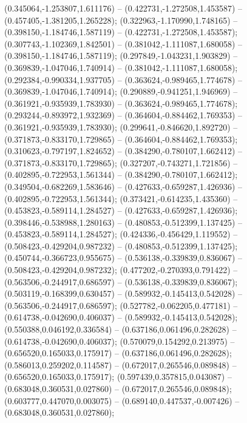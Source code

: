  (0.345064,-1.253807,1.611176) -- (0.422731,-1.272508,1.453587) -- (0.457405,-1.381205,1.265228);
 (0.322963,-1.170990,1.748165) -- (0.398150,-1.184746,1.587119) -- (0.422731,-1.272508,1.453587);
 (0.307743,-1.102369,1.842501) -- (0.381042,-1.111087,1.680058) -- (0.398150,-1.184746,1.587119);
 (0.297849,-1.043231,1.903829) -- (0.369839,-1.047046,1.740914) -- (0.381042,-1.111087,1.680058);
 (0.292384,-0.990334,1.937705) -- (0.363624,-0.989465,1.774678) -- (0.369839,-1.047046,1.740914);
 (0.290889,-0.941251,1.946969) -- (0.361921,-0.935939,1.783930) -- (0.363624,-0.989465,1.774678);
 (0.293244,-0.893972,1.932369) -- (0.364604,-0.884462,1.769353) -- (0.361921,-0.935939,1.783930);
 (0.299641,-0.846620,1.892720) -- (0.371873,-0.833170,1.729865) -- (0.364604,-0.884462,1.769353);
 (0.310623,-0.797197,1.824652) -- (0.384290,-0.780107,1.662412) -- (0.371873,-0.833170,1.729865);
 (0.327207,-0.743271,1.721856) -- (0.402895,-0.722953,1.561344) -- (0.384290,-0.780107,1.662412);
 (0.349504,-0.682269,1.583646) -- (0.427633,-0.659287,1.426936) -- (0.402895,-0.722953,1.561344);
 (0.373421,-0.614235,1.435360) -- (0.453823,-0.589114,1.284527) -- (0.427633,-0.659287,1.426936);
 (0.398446,-0.538988,1.280163) -- (0.480853,-0.512399,1.137425) -- (0.453823,-0.589114,1.284527);
 (0.424336,-0.456429,1.119552) -- (0.508423,-0.429204,0.987232) -- (0.480853,-0.512399,1.137425);
 (0.450744,-0.366723,0.955675) -- (0.536138,-0.339839,0.836067) -- (0.508423,-0.429204,0.987232);
 (0.477202,-0.270393,0.791422) -- (0.563506,-0.244917,0.686597) -- (0.536138,-0.339839,0.836067);
 (0.503119,-0.168399,0.630457) -- (0.589932,-0.145413,0.542028) -- (0.563506,-0.244917,0.686597);
 (0.527782,-0.062205,0.477181) -- (0.614738,-0.042690,0.406037) -- (0.589932,-0.145413,0.542028);
 (0.550388,0.046192,0.336584) -- (0.637186,0.061496,0.282628) -- (0.614738,-0.042690,0.406037);
 (0.570079,0.154292,0.213975) -- (0.656520,0.165033,0.175917) -- (0.637186,0.061496,0.282628);
 (0.586013,0.259202,0.114587) -- (0.672017,0.265546,0.089848) -- (0.656520,0.165033,0.175917);
 (0.597439,0.357815,0.043087) -- (0.683048,0.360531,0.027860) -- (0.672017,0.265546,0.089848);
 (0.603777,0.447070,0.003075) -- (0.689140,0.447537,-0.007426) -- (0.683048,0.360531,0.027860);
